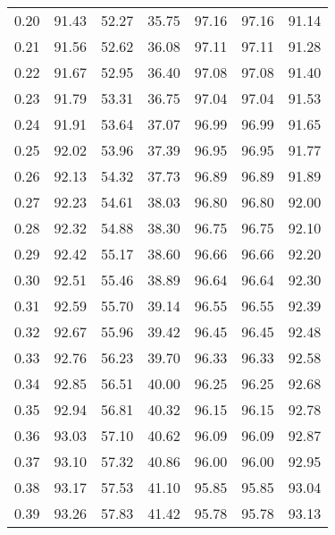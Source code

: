 \begin{tabular}{|c|c|c|c|c|c|c|}
      0.20 &     91.43 &     52.27 &      35.75 &   97.16 &      97.16 &         91.14 \\
      0.21 &     91.56 &     52.62 &      36.08 &   97.11 &      97.11 &         91.28 \\
      0.22 &     91.67 &     52.95 &      36.40 &   97.08 &      97.08 &         91.40 \\
      0.23 &     91.79 &     53.31 &      36.75 &   97.04 &      97.04 &         91.53 \\
      0.24 &     91.91 &     53.64 &      37.07 &   96.99 &      96.99 &         91.65 \\
      0.25 &     92.02 &     53.96 &      37.39 &   96.95 &      96.95 &         91.77 \\
      0.26 &     92.13 &     54.32 &      37.73 &   96.89 &      96.89 &         91.89 \\
      0.27 &     92.23 &     54.61 &      38.03 &   96.80 &      96.80 &         92.00 \\
      0.28 &     92.32 &     54.88 &      38.30 &   96.75 &      96.75 &         92.10 \\
      0.29 &     92.42 &     55.17 &      38.60 &   96.66 &      96.66 &         92.20 \\
      0.30 &     92.51 &     55.46 &      38.89 &   96.64 &      96.64 &         92.30 \\
      0.31 &     92.59 &     55.70 &      39.14 &   96.55 &      96.55 &         92.39 \\
      0.32 &     92.67 &     55.96 &      39.42 &   96.45 &      96.45 &         92.48 \\
      0.33 &     92.76 &     56.23 &      39.70 &   96.33 &      96.33 &         92.58 \\
      0.34 &     92.85 &     56.51 &      40.00 &   96.25 &      96.25 &         92.68 \\
      0.35 &     92.94 &     56.81 &      40.32 &   96.15 &      96.15 &         92.78 \\
      0.36 &     93.03 &     57.10 &      40.62 &   96.09 &      96.09 &         92.87 \\
      0.37 &     93.10 &     57.32 &      40.86 &   96.00 &      96.00 &         92.95 \\
      0.38 &     93.17 &     57.53 &      41.10 &   95.85 &      95.85 &         93.04 \\
      0.39 &     93.26 &     57.83 &      41.42 &   95.78 &      95.78 &         93.13 \\

\end{tabular}
